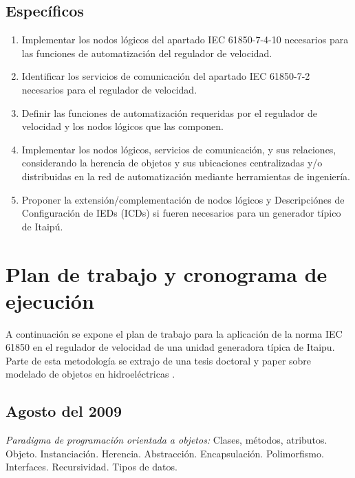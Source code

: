 \documentclass[conference,twocolumn]{IEEEtran}
\begin{document}
	\subsection{Espec\'ificos}
		\begin{enumerate}
			\item Implementar los nodos l\'ogicos del apartado IEC 61850-7-4-10 necesarios para las funciones de automatizaci\'on del regulador de velocidad.
			\item Identificar los servicios de comunicaci\'on del apartado IEC 61850-7-2 necesarios para el regulador de velocidad.
			\item Definir las funciones de automatizaci\'on requeridas por el regulador de velocidad y los nodos l\'ogicos que las componen.
			\item Implementar los nodos l\'ogicos, servicios de comunicaci\'on, y sus relaciones, considerando la herencia de objetos y sus ubicaciones centralizadas y/o distribuidas en la red de automatizaci\'on mediante herramientas de ingenier\'ia.
			\item Proponer la extensi\'on/complementaci\'on de nodos l\'ogicos y Descripci\'ones de Configuraci\'on de IEDs (ICDs) si fueren necesarios para un generador t\'ipico de Itaip\'u.
			\\
		\end{enumerate}








\section{Plan de trabajo y cronograma de ejecuci\'on}

A continuaci\'on se expone el plan de trabajo para la aplicaci\'on de la norma IEC 61850 en el regulador de velocidad de una unidad generadora t\'ipica de Itaipu.
Parte de esta metodolog\'ia se extrajo de una tesis doctoral y paper sobre modelado de objetos en hidroel\'ectricas \cite{Villacorta2002,VillacortaB}.


	\subsection{Agosto del 2009}
		\emph{Paradigma de programaci\'on orientada a objetos:}
			Clases, m\'etodos, atributos. 
			Objeto. 
			Instanciaci\'on.
			Herencia. 
			Abstracci\'on. 
			Encapsulaci\'on. 
			Polimorfismo. 
			Interfaces. 
			Recursividad. 
			Tipos de datos.
\end{document}
